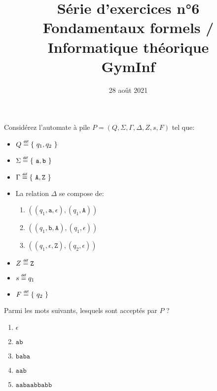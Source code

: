 \documentclass[12pt,french,a4paper]{article}
\newcommand\eqdef{\mathrel{\overset{\makebox[0pt]{\mbox{\normalfont\tiny\sffamily déf}}}{=}}}
\begin{document}
\title{\vspace{-2cm}Série d'exercices n°6\\\large{Fondamentaux formels / Informatique théorique\\GymInf}}
\date{\vspace{-1cm}28 août 2021}

\maketitle

\begin{question}

Considérez l'automate à pile $P = (Q, \Sigma, \Gamma, \Delta, Z, s, F)$ tel que:
\begin{itemize}
\item $Q \eqdef \{\ q_1, q_2\ \}$
\item $\Sigma \eqdef \{\ \texttt{a}, \texttt{b}\ \}$
\item $\Gamma \eqdef \{\ \texttt{A}, \texttt{Z}\ \}$
\item La relation $\Delta$ se compose de:
\begin{enumerate}
\item $((q_1, \texttt{a}, \epsilon), (q_1, \texttt{A}))$
\item $((q_1, \texttt{b}, \texttt{A}), (q_1, \epsilon))$
\item $((q_1, \epsilon, \texttt{Z}), (q_2, \epsilon))$
\end{enumerate}
\item $Z \eqdef \texttt{Z}$
\item $s \eqdef q_1$
\item $F \eqdef \{\ q_2\ \}$
\end{itemize}

Parmi les mots suivants, lesquels sont acceptés par $P$ ?
\begin{enumerate}
\item $\epsilon$
\item $\texttt{ab}$
\item $\texttt{baba}$
\item $\texttt{aab}$
\item $\texttt{aabaabbabb}$
\end{enumerate}

\end{question}

\vspace{2cm}
\end{document}
